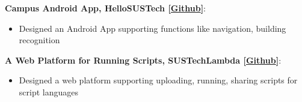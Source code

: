 \documentclass[letterpaper,11pt]{article}
\newcommand{\resumeItem}[2]{
  \item\small{
    \textbf{#1}{: #2 \vspace{-2pt}}
  }
}
\newcommand{\resumeSubItem}[2]{\resumeItem{#1}{#2}\vspace{-4pt}}
\begin{document}
  \resumeSubItem
      {Campus Android App, HelloSUSTech [\href{https://github.com/RainyTong/Hello-SUSTech}{Github}]}{}
       \begin{itemize}
       \item Designed an Android App supporting functions like navigation, building recognition %
       \end{itemize}
       
   \resumeSubItem
      {A Web Platform for Running Scripts, SUSTechLambda [\href{https://github.com/Henrycobaltech/SUSTechLambda}{Github}]}{}
       \begin{itemize}
       \item Designed a web platform supporting uploading, running, sharing scripts for script languages
       \end{itemize}
       
   
       
      
      
      
  
  
\end{document}
